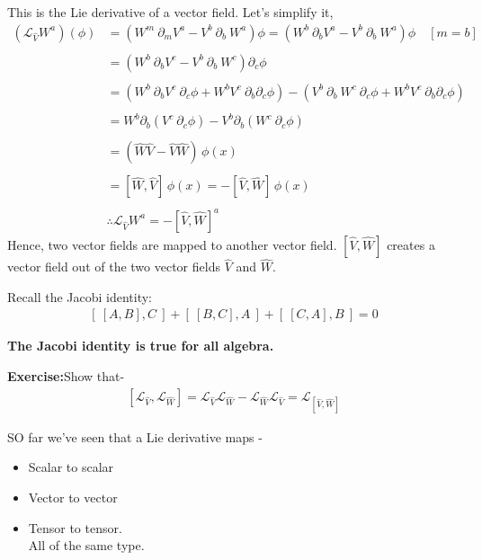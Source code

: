 \documentclass[14pt]{article} %
\begin{document}
This is the Lie derivative of a vector field. Let's simplify it,
\begin{align*}
(\mathscr{L}_{\hat{V}} W^a)(\phi) & = (W^m~\partial_m V^a - V^b~ \partial_b ~W^a)\phi= (W^b~\partial_b V^a - V^b~ \partial_b ~W^a) \phi \quad[m=b] \\\\
& = (W^b~\partial_b V^c - V^b~ \partial_b ~W^c) \partial_c \phi \\\\
&= (W^b~\partial_b V^c ~\partial_c \phi + W^b V^c~\partial_b \partial_c \phi) - (V^b~ \partial_b ~W^c~\partial_c \phi + W^b V^c~\partial_b \partial_c \phi) \\\\
&= W^b \partial_b (V^c ~ \partial_c \phi) - V^b \partial_b (W^c ~ \partial_c \phi) \\\\
& = ( \hat{W} \hat{V} - \hat{V} \hat{W})\, \phi(x) \\\\
& =[ \hat{W}, \hat{V} ]\, \phi(x) = -[ \hat{V}, \hat{W} ]\, \phi(x)\\\\
& \boxed{\therefore \mathscr{L}_{\hat{V}} W^a = -[\hat{V}, \hat{W}]^a}
\end{align*}
Hence, two vector fields are mapped to another vector field. 
$[ \hat{V}, \hat{W}]$ creates a vector field out of the two vector fields $\hat{V}$ and $\hat{W}$.
\begin{tcolorbox}[ title=Note:]
Recall the Jacobi identity:
\begin{align*}
\left[~ [ A, B], C~ \right] + \left[ ~[ B, C], A~ \right] + \left[~[ C, A ], B~ \right] = 0
\end{align*}
\begin{center}
    \textbf{The Jacobi identity is true for all algebra.}
\end{center}
\end{tcolorbox}
\begin{framed}
\noindent
\textbf{Exercise:}\quad Show that-
\begin{align*}
\left[ \mathscr{L}_{\hat{V}}, \mathscr{L}_{\hat{W}}\right] = 
\mathscr{L}_{\hat{V}} \mathscr{L}_{\hat{W}} - \mathscr{L}_{\hat{W}} \mathscr{L}_{\hat{V}} = \mathscr{L}_{[\hat{V},\hat{W}]}
\end{align*}
\end{framed}
SO far we've seen that a Lie derivative maps -
\begin{itemize}
    \item Scalar to scalar
    \item Vector to vector
    \item Tensor to tensor. \\
    All of the same type.
\end{itemize}
\end{document}
